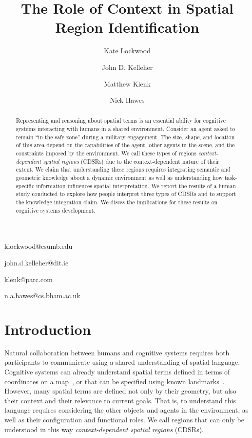 \documentclass[11pt,letterpaper]{article}
\begin{document}
 

\title{The Role of Context in Spatial Region Identification}
 
\author{Kate Lockwood}{klockwood@csumb.edu}
\address{ITCD Department, California State University - Monterey Bay}
\author{John D. Kelleher}{john.d.kelleher@dit.ie}
\address{Applied Intelligence Research Centre, Dublin Institute of Technology }
\author{Matthew Klenk}{klenk@parc.com}
\address{Palo Alto Research Center, Palo Alto CA }
\author{Nick Hawes}{n.a.hawes@cs.bham.ac.uk}
\address{Intelligent Robotics Lab, University of Birmingham, UK }
\vskip 0.2in
 
\begin{abstract}
Representing and reasoning about spatial terms is an essential ability for cognitive systems interacting with humans in a shared environment.  Consider an agent asked to remain ``in the safe zone'' during a military engagement.  The size, shape, and location of this area depend on the capabilities of the agent, other agents in the scene, and the constraints imposed by the environment.  We call these types of regions \textit{context-dependent spatial regions} (CDSRs) due to the context-dependent nature of their extent.  We claim that understanding these regions requires integrating semantic and geometric knowledge about a dynamic environment as well as understanding how task-specific information influences spatial interpretation.  We report the results of a human study conducted to explore how people interpret three types of CDSRs and to support the knowledge integration claim.  We discss the implications for these results on cognitive systems development.
\end{abstract}

\section{Introduction} 
Natural collaboration between humans and cognitive systems requires both participants to communicate using a shared understanding of spatial language.  Cognitive systems can already understand spatial terms defined in terms of coordinates on a map~\cite{Zender2008a}, or that can be specified using known landmarks~\cite{brenneretal07ijcai}.  However, many spatial terms are defined not only by their geometry, but also their context and their relevance to current goals.  That is, to understand this language requires considering the other objects and agents in the environment, as well as their configuration and functional roles.  We call regions that can only be understood in this way \textit{context-dependent spatial regions} (CDSRs).
\end{document}
